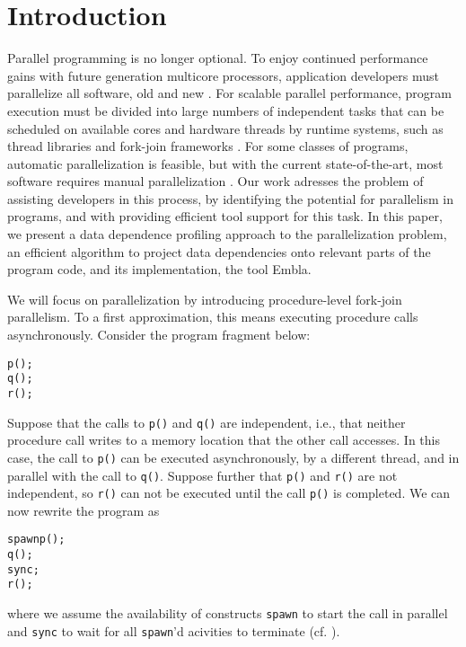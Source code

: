 %

\section{Introduction}

Parallel programming is no longer optional.  To enjoy continued
performance gains with future generation multicore processors,
application developers must parallelize all software, old and new
\cite{TEL95,ONHWC96,KAB03,Sutter05}.  For scalable parallel
performance, program execution must be divided into large numbers of
independent tasks that can be scheduled on available cores and
hardware threads by runtime systems, such as thread libraries and
fork-join frameworks \cite{}.  For some classes of programs, automatic
parallelization is feasible, but with the current state-of-the-art,
most software requires manual parallelization \cite{}.  Our work
adresses the problem of assisting developers in this process, by
identifying the potential for parallelism in programs, and with
providing efficient tool support for this task.  In this paper, we
present a data dependence profiling approach to the parallelization
problem, an efficient algorithm to project data dependencies onto
relevant parts of the program code, and its implementation, the tool
Embla.

We will focus on parallelization by introducing procedure-level
fork-join parallelism.  To a first approximation, this means executing
procedure calls asynchronously.  Consider the program fragment below:
\begin{alltt}
   p();
   q();
   r();
\end{alltt}
Suppose that the calls to {\tt p()} and {\tt q()} are independent,
i.e., that neither procedure call writes to a memory location that the
other call accesses.  In this case, the call to {\tt p()} can be
executed asynchronously, by a different thread, and in parallel with
the call to {\tt q()}.  Suppose further that {\tt p()} and {\tt r()}
are not independent, so {\tt r()} can not be executed until the call
{\tt p()} is completed.  We can now rewrite the program as
\begin{alltt}
   spawn p();
   q();
   sync;
   r();
\end{alltt}

where we assume the availability of constructs {\tt spawn} to start
the call in parallel and {\tt sync} to wait for all {\tt spawn}'d
acivities to terminate (cf. \cite{BJKLR96,frigo98implementation}).

